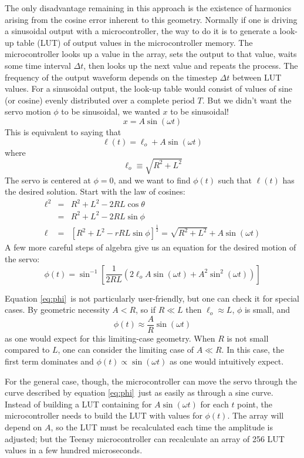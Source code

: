 \documentclass[11 pt]{article}
\begin{document}
The only disadvantage remaining in this approach is the existence of harmonics arising from the cosine error inherent to this geometry. 
Normally if one is driving a sinusoidal output with a microcontroller, the way to do it is to generate a look-up table (LUT) of output values in the microcontroller memory.
The microcontroller looks up a value in the array, sets the output to that value, waits some time interval $\Delta t$, then looks up the next value and repeats the process. 
The frequency of the output waveform depends on the timestep $\Delta t$ between LUT values.
For a sinusoidal output, the look-up table would consist of values of sine (or cosine) evenly distributed over a complete period $T$.
But we didn't want the servo motion $\phi$ to be sinusoidal, we wanted $x$ to be sinusoidal!
\[ x = A \sin(\omega t) \]
This is equivalent to saying that
\[ \ell(t) = \ell_o + A \sin(\omega t) \]
where 
\[ \ell_o \equiv \sqrt{R^2+L^2} \]
The servo is centered at $\phi=0$, and we want to find $\phi(t)$ such that $\ell(t)$ has the desired solution.
Start with the law of cosines:
\begin{eqnarray*} 
	\ell^2 &=& R^2 + L^2 - 2 R L \cos\theta\\
		&=& R^2 + L^2 - 2 R L \sin\phi\\
	\ell &=& \left[ R^2+L^2 - r R L \sin\phi \right]^{\frac{1}{2}} = \sqrt{R^2+L^2} + A \sin(\omega t)
\end{eqnarray*}
A few more careful steps of algebra give us an equation for the desired motion of the servo:
\begin{equation} \label{eq:phi}
	\phi(t) = \sin^{-1} \left[\frac{1}{2RL}\left(2\ell_o A\sin(\omega t) + A^2 \sin^2(\omega t)\right)\right]
\end{equation}

Equation \ref{eq:phi}\ is not particularly user-friendly, but one can check it for special cases. 
By geometric necessity $A<R$, so if $R\ll L$ then $\ell_o \approx L$, $\phi$ is small, and 
\[ \phi(t) \approx \frac{A}{R}\sin(\omega t) \]
as one would expect for this limiting-case geometry.
When $R$ is not small compared to $L$, one can consider the limiting case of $A \ll R$. 
In this case, the first term dominates and $\phi(t) \propto \sin(\omega t)$ as one would intuitively expect. 

For the general case, though, the microcontroller can move the servo through the curve described by equation \ref{eq:phi}\ just as easily as through a sine curve. 
Instead of building a LUT containing for $A\sin(\omega t)$ for each $t$ point, the microcontroller needs to build the LUT with values for $\phi(t)$.
The array will depend on $A$, so the LUT must be recalculated each time the amplitude is adjusted; but the Teensy microcontroller can recalculate an array of 256 LUT values in a few hundred microseconds.
\end{document}
